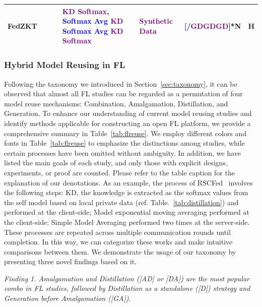 \begin{table}[htp]
\begin{longtable}{|p{1.68cm}|p{1.2cm}|p{1.25cm}|p{5.0cm}|p{2.59cm}|p{1.2cm}|p{0.35cm}|}
    FedZKT~\cite{zhang2022fedzkt} & & &\textcolor{purple}{KD} \textcolor{purple}{\textbf{Softmax}}, \textcolor{blue}{\textbf{Softmax Avg}} \textcolor{purple}{KD} \textcolor{blue}{\textbf{Softmax Avg}} \textcolor{purple}{KD} \textcolor{purple}{\textbf{Softmax}} & \textcolor{purple}{\textbf{Synthetic Data}} & [\textcolor{blue}{/}\textcolor{purple}{GDGDGD}]*N & H \\ \hline

  \end{longtable}
\end{table}

\subsubsection{Hybrid Model Reusing in FL}
\label{sec:hybrid}
Following the taxonomy we introduced in Section~\ref{sec:taxonomy}, it can be observed that almost all FL studies can be regarded as a permutation of four model reuse mechanisms: Combination, Amalgamation, Distillation, and Generation.
To enhance our understanding of current model reusing studies and identify methods applicable for constructing an open FL platform, we provide a comprehensive summary in Table~\ref{tab:flreuse}. 
We employ different colors and fonts in Table~\ref{tab:flreuse} to emphasize the distinctions among studies, while certain processes have been omitted without ambiguity.
In addition, we have listed the main goals of each study, and only those with explicit designs, experiments, or proof are counted.
Please refer to the table caption for the explanation of our denotations.
As an example, the process of RSCFed~\cite{liang2022rscfed} involves the following steps: 
 KD, the knowledge is extracted as the softmax values from the self model based on local private data (ref. Table.~\ref{tab:distillation}) and performed at the client-side;
 Model exponential moving averaging performed at the client-side;
 Simple Model Averaging performed two times at the server-side.
These processes are repeated across multiple communication rounds until completion.
In this way, we can categorize these works and make intuitive comparisons between them.
We demonstrate the usage of our taxonomy by presenting three novel findings based on it.

\textit{Finding 1. Amalgamation and Distillation ([AD] or [DA]) are the most popular combo in FL studies, followed by Distillation as a standalone ([D]) strategy and Generation before Amalgamation ([GA])}.

